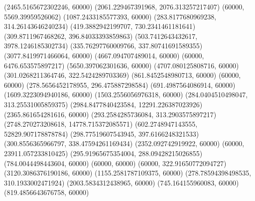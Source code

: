 {(2465.5165672302246, 60000) %
(2061.229467391968, 2076.313257217407) %
(60000, 5569.39959526062) %
(1087.2433185577393, 60000) %
(283.8177680969238, 314.26143646240234) %
(419.3882942199707, 730.2341461181641) %
(309.8711967468262, 396.84033393859863) %
(503.7412643432617, 3978.1246185302734) %
(335.76297760009766, 337.80741691589355) %
(3077.8419971466064, 60000) %
(4667.094707489014, 60000) %
(60000, 6476.653575897217) %
(5650.397062301636, 60000) %
(4707.080125808716, 60000) %
(301.0268211364746, 322.5424289703369) %
(861.8452548980713, 60000) %
(60000, 60000) %
(278.5656452178955, 296.475887298584) %
(691.4987564086914, 60000) %
(1609.3223094940186, 60000) %
(1503.2556056976318, 60000) %
(284.0404510498047, 313.25531005859375) %
(2984.8477840423584, 12291.226387023926) %
(2365.861654281616, 60000) %
(293.2584285736084, 313.2903575897217) %
(2748.270273208618, 14778.715372085571) %
(602.2748947143555, 52829.907178878784) %
(298.77519607543945, 397.6166248321533) %
(300.8556365966797, 338.47594261169434) %
(2352.092742919922, 60000) %
(60000, 23911.057233810425) %
(295.91965675354004, 288.09428215026855) %
(784.0044498443604, 60000) %
(60000, 60000) %
(60000, 322.91650772094727) %
(3120.3086376190186, 60000) %
(1155.2581787109375, 60000) %
(278.78594398498535, 310.1933002471924) %
(2003.5834312438965, 60000) %
(745.164155960083, 60000) %
(819.4856643676758, 60000) %
}
